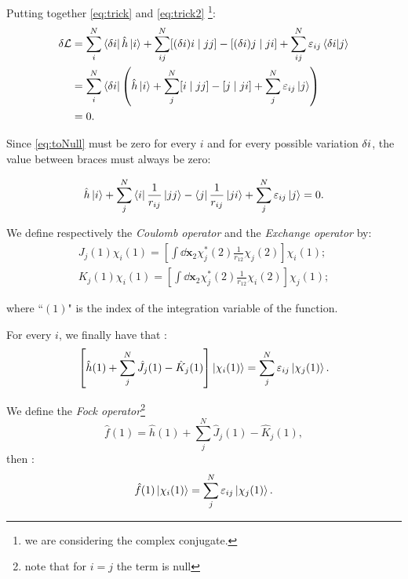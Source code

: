\documentclass[a4paper,12pt]{article}
\begin{document}
Putting together \eqref{eq:trick} and \eqref{eq:trick2} \footnote{ we are considering the complex conjugate.}:
\begin{align}
	\var{\mathcal{L}} & = \sum_{i}^{N} \bra{\var{i}} \hat{h}  \ket{i} + \sum_{ij}^{N}  [ (\var{i})i \mid j j ] - [ (\var{i}) j \mid j i ] + \sum_{ij}^{N} \varepsilon_{ij} \bra{\var{i}}\ket{j}\\
	& = \sum_{i}^{N} \bra{\var{i}} \left( 
		 \hat{h}  \ket{i} + \sum_{j}^{N}  [ i \mid j j ] - [  j \mid j i ] + \sum_{j}^{N} \varepsilon_{ij} \ket{j}
	\right) \label{eq:toNull}
	\\
	& = 0.
\end{align}

Since \eqref{eq:toNull} must be zero for every $i$ and for every possible variation $\var{i}$, the value between braces must  always be zero:

\begin{equation}
	\hat{h}  \ket{i} + \sum_{j}^{N}  \bra{i} \frac{1}{r_{ij}} \ket{j j } - \bra{ j } \frac{1}{r_{ij}} \ket{j i} + \sum_{j}^{N} \varepsilon_{ij} \ket{j} = 0.
\end{equation}

We define respectively the \textit{Coulomb operator} and the \textit{Exchange operator} by:
\begin{align}
	J_{j}(1) \chi_{i}(1) = \left[  \int \dd \mathbf{x}_{2} \chi_{j}^{*}(2) \frac{1}{r_{12}} \chi_{j}(2) \right] \chi_i(1); \label{eq:coulombOperator} \\
	K_{j}(1) \chi_{i}(1) = \left[  \int \dd \mathbf{x}_{2} \chi_{j}^{*}(2) \frac{1}{r_{12}} \chi_{i}(2) \right] \chi_j(1);
\label{eq:exchangeOperator}
\end{align}

where ``$(1)$" is the index of the integration variable of the function.

For every $i$, we finally have that :
\begin{align}
	\left[ \hat{h}(1) + \sum_{j}^{N} \hat{J}_{j}(1) - \hat{K}_{j}(1) \right] \ket{\chi_i(1)} = \sum_{j}^{N} \varepsilon_{ij} \ket{\chi_{j}(1)}. \label{eq:HartreeNonCan}
\end{align}

We define the \textit{Fock operator}\footnote{note that for $i=j$ the term is null}
\begin{equation}\label{eq:FockOperator}
	\hat{f}(1) = \hat{h}(1) + \sum_{j}^{N} \hat{J}_{j}(1) - \hat{K}_{j}(1),
\end{equation}
then :
\begin{align}
	\hat{f}(1)\ket{\chi_i(1)} = \sum_{j}^{N} \varepsilon_{ij} \ket{\chi_{j}(1)} .
\end{align}
\end{document}
